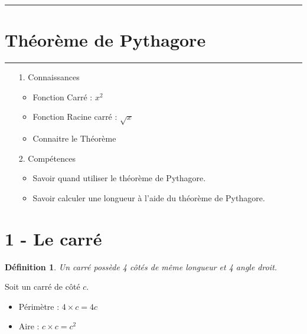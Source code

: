 \documentclass[11pt]{article}
\newcommand{\horrule}[1]{\rule{\linewidth}{#1}} %
\begin{document}

\newtheorem{Definition}{Définition}
\newtheorem{Theorem}{Théorème}
\newtheorem{Proposition}{Propriété}

\renewcommand{\labelitemi}{$\bullet$}
\renewcommand{\labelitemii}{$\circ$}

\setlength{\columnseprule}{1pt}

\horrule{2px}
\section{Théorème de Pythagore}
\horrule{2px}

\begin{enumerate}
    \item[1.] Connaissances
    \begin{itemize}
        \item Fonction Carré : $x^2$
        \item Fonction Racine carré : $\sqrt{x}$ 
        \item Connaitre le Théorème
    \end{itemize}
    \item[2.] Compétences
    \begin{itemize}
        \item Savoir quand utiliser le théorème de Pythagore.
        \item Savoir calculer une longueur à l'aide du théorème de Pythagore.
    \end{itemize}
\end{enumerate}

\section*{1 - Le carré}

\begin{Definition}
    Un carré possède 4 côtés de même longueur et 4 angle droit.
\end{Definition}

Soit un carré de côté $c$.
\begin{itemize}
    \item Périmètre : $4 \times c = 4c$
    \item Aire : $c \times c = c^2$ 
\end{itemize}
\end{document}
